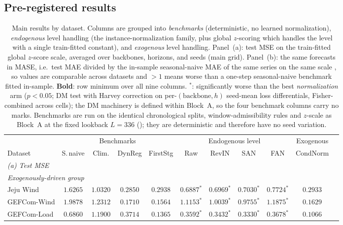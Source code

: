 \subsection{Pre-registered results}

\begin{table}[t]
\centering
\caption{Main results by dataset. Columns are grouped into \emph{benchmarks} (deterministic, no learned normalization), \emph{endogenous} level handling (the instance-normalization family, plus global $z$-scoring which handles the level with a single train-fitted constant), and \emph{exogenous} level handling. Panel~(a): test MSE on the train-fitted global $z$-score scale, averaged over backbones, horizons, and seeds (main grid). Panel~(b): the same forecasts in MASE, i.e.\ test MAE divided by the in-sample seasonal-naive MAE of the same series on the same scale \citep{hyndman2006another}, so values are comparable across datasets and $>1$ means worse than a one-step seasonal-naive benchmark fitted in-sample. \textbf{Bold}: row minimum over all nine columns. $^{*}$: significantly worse than the best \emph{normalization} arm ($p<0.05$; DM test with Harvey correction on per-$(\text{backbone},h)$ seed-mean loss differentials, Fisher-combined across cells); the DM machinery is defined within Block~A, so the four benchmark columns carry no marks. Benchmarks are run on the identical chronological splits, window-admissibility rules and $z$-scale as Block~A at the fixed lookback $L=336$ (); they are deterministic and therefore have no seed variation.}
\label{tab:main}
\small
\setlength{\tabcolsep}{3.2pt}
\begin{tabular}{lcccccccccc}
\toprule
& \multicolumn{4}{c}{Benchmarks} & \multicolumn{4}{c}{Endogenous level} & Exogenous \\
\cmidrule(lr){2-5}\cmidrule(lr){6-9}\cmidrule(lr){10-10}
Dataset & S.\,naive & Clim. & DynReg & FirstStg & Raw & RevIN & SAN & FAN & CondNorm \\
\midrule
\multicolumn{10}{l}{\emph{(a) Test MSE}} \\[2pt]
\multicolumn{10}{l}{\emph{Exogenously-driven group}} \\
Jeju Wind     & $1.6265$ & $1.0320$ & $\mathbf{0.2850}$ & $0.2938$ & $0.6887^{*}$ & $0.6969^{*}$ & $0.7030^{*}$ & $0.7724^{*}$ & $0.2933$ \\
GEFCom-Wind   & $1.9878$ & $1.2312$ & $0.1710$ & $\mathbf{0.1564}$ & $1.1153^{*}$ & $1.0039^{*}$ & $0.9755^{*}$ & $1.1875^{*}$ & $0.1629$ \\
GEFCom-Load   & $0.6860$ & $1.1900$ & $0.3714$ & $0.1365$ & $0.3592^{*}$ & $0.3432^{*}$ & $0.3330^{*}$ & $0.3678^{*}$ & $\mathbf{0.1066}$ \\

\end{tabular}
\end{table}
